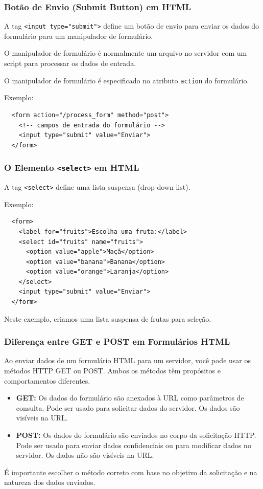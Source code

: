 \documentclass{beamer}
\begin{document}
\begin{frame}[fragile]
  \frametitle{Botão de Envio (Submit Button) em HTML}

  A tag \texttt{<input type="submit">} define um botão de envio para enviar os dados do formulário para um manipulador de formulário.

  O manipulador de formulário é normalmente um arquivo no servidor com um script para processar os dados de entrada.

  O manipulador de formulário é especificado no atributo \texttt{action} do formulário.

  Exemplo:

  \begin{verbatim}
  <form action="/process_form" method="post">
    <!-- campos de entrada do formulário -->
    <input type="submit" value="Enviar">
  </form>
  \end{verbatim}
\end{frame}

\begin{frame}[fragile]
  \frametitle{O Elemento \texttt{<select>} em HTML}

  A tag \texttt{<select>} define uma lista suspensa (drop-down list).

  Exemplo:

  \begin{verbatim}
  <form>
    <label for="fruits">Escolha uma fruta:</label>
    <select id="fruits" name="fruits">
      <option value="apple">Maçã</option>
      <option value="banana">Banana</option>
      <option value="orange">Laranja</option>
    </select>
    <input type="submit" value="Enviar">
  </form>
  \end{verbatim}

  Neste exemplo, criamos uma lista suspensa de frutas para seleção.
\end{frame}


\begin{frame}
  \frametitle{Diferença entre GET e POST em Formulários HTML}

  Ao enviar dados de um formulário HTML para um servidor, você pode usar os métodos HTTP GET ou POST. Ambos os métodos têm propósitos e comportamentos diferentes.

  \begin{itemize}
    \item \textbf{GET:} Os dados do formulário são anexados à URL como parâmetros de consulta. Pode ser usado para solicitar dados do servidor. Os dados são visíveis na URL.
    
    \item \textbf{POST:} Os dados do formulário são enviados no corpo da solicitação HTTP. Pode ser usado para enviar dados confidenciais ou para modificar dados no servidor. Os dados não são visíveis na URL.
  \end{itemize}

  É importante escolher o método correto com base no objetivo da solicitação e na natureza dos dados enviados.
\end{frame}
\end{document}

